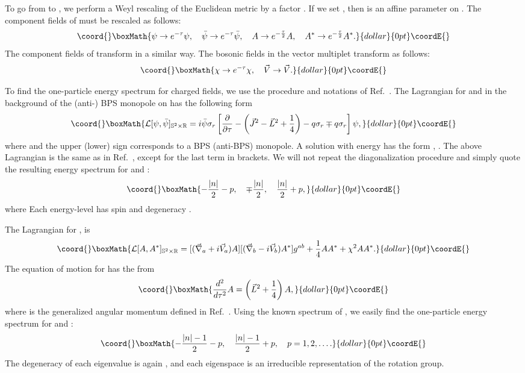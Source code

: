 \documentclass[a4paper,12pt, amsfonts, amssymb]{article}
\providecommand{\RR}{{\mathbb R}}
\renewcommand{\SS}{{\mathbb S}}
\providecommand{\ra}{\rightarrow}
\providecommand{\tQ}{{\tilde Q}}
\begin{document}
To go from \myHighlight{$\RR^3$}\coordHE{} to \myHighlight{$\SS^2\times \RR$}\coordHE{}, we perform
a Weyl rescaling of the Euclidean metric \coordHE{} by a 
factor \coordHE{}. If we set \coordHE{}, then \myHighlight{$\tau$}\coordHE{} is
an affine parameter on \myHighlight{$\RR$}\coordHE{}. The component fields of \coordHE{} must be rescaled 
as follows:
$$\coord{}\boxMath{
\psi\ra e^{-\tau}\psi,\quad \bar{\psi}\ra e^{-\tau}\bar{\psi}, \quad
A\ra e^{-\frac{\tau}{2}}A,\quad A^*\ra e^{-\frac{\tau}{2}}A^*.
}{dollar}{0pt}\coordE{}$$
The component fields of \myHighlight{$\tQ$}\coordHE{} transform in a similar way. 
The bosonic fields in the vector multiplet transform as follows:
$$\coord{}\boxMath{
\chi \to e^{-\tau}\chi,\quad \vec{V}\to\vec{V}.
}{dollar}{0pt}\coordE{}$$

To find the one-particle energy spectrum for charged fields, we use the
procedure and notations of Ref.~\cite{BKWone}.
The Lagrangian for \myHighlight{$\psi$}\coordHE{} and \myHighlight{$\bar{\psi}$}\coordHE{} in the background of the
(anti-) BPS monopole on \myHighlight{$\RR^3$}\coordHE{} has the following form 
$$\coord{}\boxMath{
{\cal L}[\psi,\bar{\psi}]_{\SS^2\times\RR}=i\bar{\psi}\sigma_r
\left[{\frac{\partial}{\partial\tau}}-\left(\vec{J}^2-\vec{L}^2+
\frac14\right)-q\sigma_r \mp q\sigma_r\right]\psi,
}{dollar}{0pt}\coordE{}$$
where \coordHE{} and the upper (lower) sign corresponds to a BPS 
(anti-BPS) monopole. A solution with energy
\coordHE{} has the form \coordHE{}, \coordHE{}.
The above Lagrangian is the same as in Ref.~\cite{BKWone}, except
for the last term in brackets. We will not repeat the diagonalization
procedure and simply quote the resulting energy spectrum for 
\myHighlight{$\psi$}\coordHE{} and \myHighlight{$\tilde{\psi}$}\coordHE{}:
$$\coord{}\boxMath{
-\frac{|n|}{2}-p,\quad \mp\frac{|n|}{2},\quad \frac{|n|}{2}+p,
}{dollar}{0pt}\coordE{}$$
where \coordHE{}
Each energy-level has spin \coordHE{} and degeneracy \coordHE{}.

The Lagrangian for \coordHE{}, \coordHE{} is
$$\coord{}\boxMath{
{\cal L}[A,A^*]_{\SS^2\times\RR}=[(\vec{\nabla}_a+i\vec{V}_a)A]
[(\vec{\nabla}_b-i\vec{V}_b)A^*]g^{ab}+\frac14 AA^*+\chi^2 AA^*.
}{dollar}{0pt}\coordE{}$$
The equation of motion for \coordHE{} has the from 
$$\coord{}\boxMath{
\frac{d^2}{d\tau^2}A=\left(\vec{L}^2+\frac14\right)A,
}{dollar}{0pt}\coordE{}$$
where \coordHE{} is the generalized angular momentum defined in Ref.~\cite{WY}.
Using the known spectrum of \coordHE{}, we easily find the one-particle
energy spectrum for \coordHE{} and \coordHE{}:
$$\coord{}\boxMath{
-\frac{|n|-1}{2}-p,\quad \frac{|n|-1}{2}+p,\quad p=1,2,\ldots.
}{dollar}{0pt}\coordE{}$$
The degeneracy of each eigenvalue is again \coordHE{}, and each eigenspace
is an irreducible representation of the rotation group.
\end{document}
